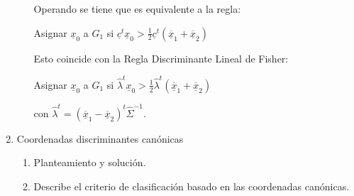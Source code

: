\documentclass[twoside]{article}
\newcommand{\muestra}[1]{{\underline{#1}}}
\newcommand{\m}[1]{{\muestra{#1}}}
\begin{document}
\begin{enumerate}
\begin{enumerate}
\begin{sol}
	Operando se tiene que es equivalente a la regla:
	\begin{center}Asignar $\m{x}_0$ a $G_1$ si $\m{c}^t \m{x}_0 > \frac{1}{2} \m{c}^t (\m{\overline{x}}_1 + \m{\overline{x}}_2)$\end{center}
	Esto coincide con la Regla Discriminante Lineal de Fisher:
	\begin{center}Asignar $\m{x}_0$ a $G_1$ si $\widehat{\lambda}^t \m{x}_0 > \frac{1}{2} \widehat{\lambda}^t (\m{\overline{x}}_1 + \m{\overline{x}}_2)$\end{center}
	con $\widehat{\lambda}^t = (\m{\overline{x}}_1 - \m{\overline{x}}_2)^t \widehat{\Sigma}^{-1}$.
	\end{sol}
\end{enumerate}
\item Coordenadas discriminantes canónicas 
\begin{enumerate}
	\item Planteamiento y solución.
	\item Describe el criterio de clasificación basado en las coordenadas canónicas.
\end{enumerate}
\end{enumerate}
\end{document}
